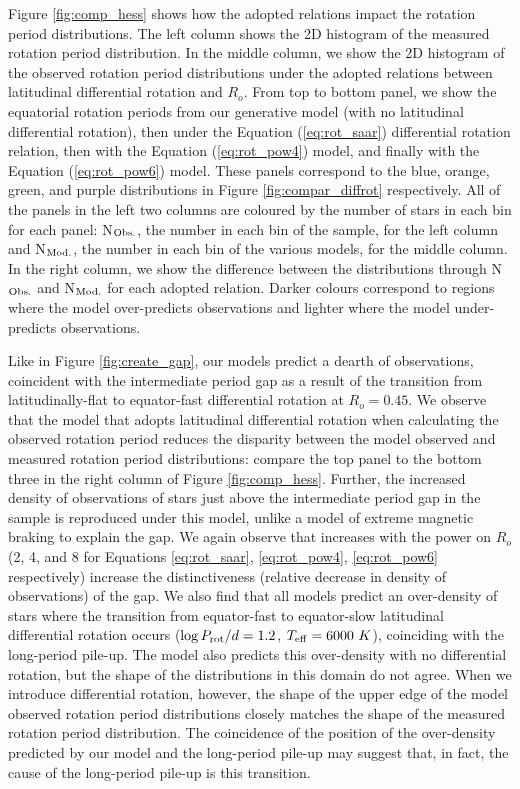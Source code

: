 Figure \ref{fig:comp_hess} shows how the adopted relations impact the rotation period distributions.
The left column shows the 2D histogram of the \citet{mcquillan_rotation_2014} measured rotation period distribution.
In the middle column, we show the 2D histogram of the observed rotation period distributions under the adopted relations between latitudinal differential rotation and $R_o$.
From top to bottom panel, we show the equatorial rotation periods from our generative model (with no latitudinal differential rotation), then under the \citet{saar_starspots_2011} Equation (\ref{eq:rot_saar}) differential rotation relation, then with the Equation (\ref{eq:rot_pow4}) model, and finally with the Equation (\ref{eq:rot_pow6}) model.
These panels correspond to the blue, orange, green, and purple distributions in Figure \ref{fig:compar_diffrot} respectively.
All of the panels in the left two columns are coloured by the number of stars in each bin for each panel: N$_{\rm{Obs.}}$, the number in each bin of the \citet{mcquillan_rotation_2014} sample, for the left column and N$_{\rm{Mod.}}$, the number in each bin of the various models, for the middle column.
In the right column, we show the difference between the distributions through N$_{\rm{Obs.}}$ and N$_{\rm{Mod.}}$ for each adopted relation.
Darker colours correspond to regions where the model over-predicts observations and lighter where the model under-predicts observations.

Like in Figure \ref{fig:create_gap}, our models predict a dearth of observations, coincident with the intermediate period gap as a result of the transition from latitudinally-flat to equator-fast differential rotation at $R_o = 0.45$.
We observe that the model that adopts latitudinal differential rotation when calculating the observed rotation period reduces the disparity between the model observed and measured rotation period distributions: compare the top panel to the bottom three in the right column of Figure \ref{fig:comp_hess}.
Further, the increased density of observations of stars just above the intermediate period gap in the \kepler{} sample is reproduced under this model, unlike a model of extreme magnetic braking to explain the gap.
We again observe that increases with the power on $R_o$ (2, 4, and 8 for Equations \ref{eq:rot_saar}, \ref{eq:rot_pow4}, \ref{eq:rot_pow6} respectively) increase the distinctiveness (relative decrease in density of observations) of the gap.
We also find that all models predict an over-density of stars where the transition from equator-fast to equator-slow latitudinal differential rotation occurs ($\log P_{\rm{rot}}/d = 1.2$, $T_{\rm{eff}} = 6000 \ K$), coinciding with the long-period pile-up.
The model also predicts this over-density with no differential rotation, but the shape of the distributions in this domain do not agree.
When we introduce differential rotation, however, the shape of the upper edge of the model observed rotation period distributions closely matches the shape of the measured rotation period distribution.
The coincidence of the position of the over-density predicted by our model and the long-period pile-up may suggest that, in fact, the cause of the long-period pile-up is this transition.


